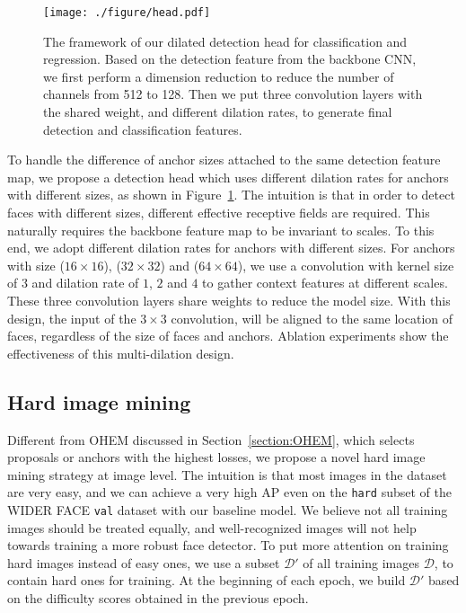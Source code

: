 \documentclass[10pt,twocolumn,letterpaper]{article}
\begin{document}
\begin{figure}[!t]
\texttt{[image: ./figure/head.pdf]}
\caption{The framework of our dilated detection head for classification and regression.
Based on the detection feature from the backbone CNN, we first
perform a dimension reduction to reduce the number of channels from 512 to 128.
Then we put three convolution layers with the shared weight, and different dilation rates,
to generate final detection and classification features.}
\label{fig:head}
\end{figure}
To handle the difference of anchor sizes attached to the same detection feature map, we propose a detection head which uses different dilation rates for anchors with
different sizes, as shown in Figure~\ref{fig:head}.
The intuition is that in order to detect faces with different sizes,
different effective receptive fields are required. This naturally
requires the backbone feature map to be invariant to scales. To this end,
we adopt different dilation rates for anchors with different sizes.
For anchors with size ($16\times 16$),
($32\times 32$) and ($64\times 64$), we use a convolution with kernel size of
$3$ and dilation rate of $1$, $2$ and $4$ to gather context features at
different scales. These three convolution layers share weights to
reduce the model size. With this design, the input of the $3\times 3$ convolution,
will be aligned to the same location of faces, regardless of the size of faces
and anchors. Ablation experiments show the effectiveness of this multi-dilation design.


\subsection{Hard image mining}\label{sec:HIM}
Different from OHEM discussed in Section~\ref{section:OHEM}, which selects proposals or anchors
with the highest losses,
we propose a novel
hard image mining strategy at image level. The intuition is that most images in the
dataset are very easy, and we can achieve a very high AP even on the \texttt{hard} subset
of the WIDER FACE \texttt{val}
dataset with our baseline model. We believe not all training images should be treated
equally, and well-recognized images will not help towards training a more robust
face detector. To put more attention on training hard images instead of easy ones,
we use a subset $\mathcal{D}'$ of all training images $\mathcal{D}$, to contain hard ones for
training. At the beginning of each epoch, we build $\mathcal{D}'$ based on
the difficulty scores obtained in the previous epoch.
\end{document}
